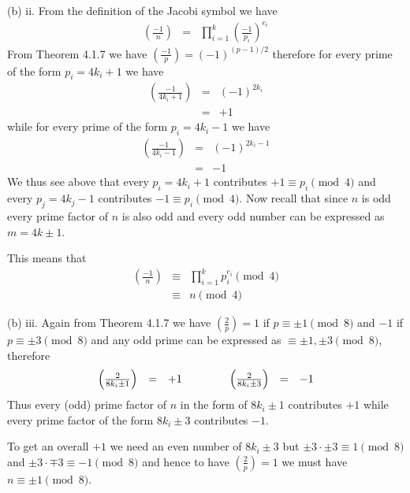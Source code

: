 \documentclass[aps,preprint,preprintnumbers,nofootinbib,showpacs,prd]{revtex4-1}
\newcommand{\nbea}{\begin{eqnarray*}}
\newcommand{\neea}{\end{eqnarray*}}
\begin{document}
(b) ii. From the definition of the Jacobi symbol we have
%
\nbea
\left ( \frac{-1}{n}\right ) & = & \prod_{i=1}^k \left ( \frac{-1}{p_i} \right )^{e_i}
\neea
%
From Theorem 4.1.7 we have $\left ( \frac{-1}{p}\right ) = (-1)^{(p-1)/2}$ therefore for every prime of the form $p_i = 4k_i+1$ we have
%
\nbea
\left ( \frac{-1}{4k_i+1}\right ) & = & (-1)^{2k_i} \\
& = & +1
\neea
%
while for every prime of the form $p_i = 4k_i-1$ we have
%
\nbea
\left ( \frac{-1}{4k_i-1}\right ) & = & (-1)^{2k_i-1} \\
& = & -1
\neea
%
We thus see above that every $p_i = 4k_i + 1$ contributes $+1 \equiv p_i \pmod{4}$ and every $p_j = 4k_j - 1$ contributes $-1 \equiv p_i \pmod{4}$. Now recall that since $n$ is odd every prime factor of $n$ is also odd and every odd number can be expressed as $m = 4k \pm 1$.

This means that 
%
\nbea
\left ( \frac{-1}{n}\right ) & \equiv & \prod_{i=1}^k p_i^{e_i} \pmod{4} \\
& \equiv & n \pmod{4}
\neea
%

(b) iii. Again from Theorem 4.1.7 we have $\left ( \frac{2}{p} \right ) = 1$ if $p \equiv \pm 1 \pmod{8}$ and $-1$ if $p \equiv \pm 3 \pmod{8}$ and any odd prime can be expressed as $\equiv \pm 1, \pm 3 \pmod{8}$, therefore
%
\nbea
\begin{array}{r c l c r c l}
\left ( \frac{2}{8k_i\pm1}\right ) & = & +1 & ~~~~~~~ & \left ( \frac{2}{8k_i\pm3}\right ) & = & -1
\end{array}
\neea
%
Thus every (odd) prime factor of $n$ in the form of $8k_i\pm1$ contributes $+1$ while every prime factor of the form $8k_i\pm3$ contributes $-1$.

To get an overall $+1$ we need an even number of $8k_i\pm3$ but $\pm3\cdot\pm3 \equiv 1 \pmod{8}$ and $\pm3\cdot\mp3 \equiv -1 \pmod{8}$ and hence to have $\left ( \frac{2}{p} \right ) = 1$ we must have $n \equiv \pm 1 \pmod{8}$.
\end{document}
